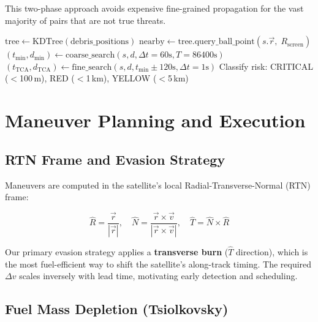 \documentclass[11pt, a4paper]{article}
\begin{document}
This two-phase approach avoids expensive fine-grained propagation for the vast majority of pairs that are not true threats.

\begin{algorithm}[H]
\caption{Conjunction Assessment Pipeline}
\begin{algorithmic}[1]
\State $\text{tree} \gets \text{KDTree}(\text{debris\_positions})$
  \State $\text{nearby} \gets \text{tree.query\_ball\_point}(s.\vec{r},\; R_\text{screen})$
    \State $(t_\text{min}, d_\text{min}) \gets \text{coarse\_search}(s, d, \Delta t = 60\text{s}, T = 86400\text{s})$
      \State $(t_\text{TCA}, d_\text{TCA}) \gets \text{fine\_search}(s, d, t_\text{min} \pm 120\text{s}, \Delta t = 1\text{s})$
      \State Classify risk: CRITICAL ($<$100\,m), RED ($<$1\,km), YELLOW ($<$5\,km)
    \EndIf
  \EndFor
\EndFor
\end{algorithmic}
\end{algorithm}

\section{Maneuver Planning and Execution}

\subsection{RTN Frame and Evasion Strategy}

Maneuvers are computed in the satellite's local Radial-Transverse-Normal (RTN) frame:

\begin{equation}
  \hat{R} = \frac{\vec{r}}{|\vec{r}|}, \quad
  \hat{N} = \frac{\vec{r} \times \vec{v}}{|\vec{r} \times \vec{v}|}, \quad
  \hat{T} = \hat{N} \times \hat{R}
\end{equation}

Our primary evasion strategy applies a \textbf{transverse burn} ($\hat{T}$ direction), which is the most fuel-efficient way to shift the satellite's along-track timing. The required $\Delta v$ scales inversely with lead time, motivating early detection and scheduling.

\subsection{Fuel Mass Depletion (Tsiolkovsky)}
\end{document}
